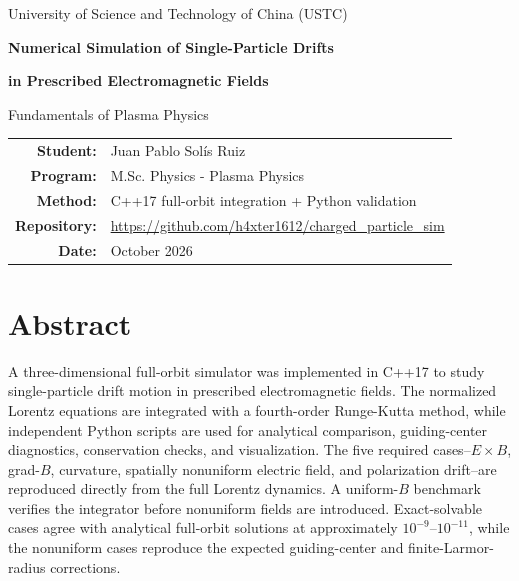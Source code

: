 \documentclass[11pt,a4paper]{article}
\begin{document}
\begin{titlepage}
    \centering
    \vspace*{2.0cm}

    {\Large University of Science and Technology of China (USTC)\par}
    \vspace{1.1cm}

    {\huge\bfseries Numerical Simulation of Single-Particle Drifts\par}
    \vspace{0.25cm}
    {\huge\bfseries in Prescribed Electromagnetic Fields\par}

    \vspace{1.4cm}
    {\Large Fundamentals of Plasma Physics\par}

    \vfill

    \begin{tabular}{rl}
        \textbf{Student:} & Juan Pablo Solís Ruiz \\
        \textbf{Program:} & M.Sc. Physics - Plasma Physics \\
        \textbf{Method:} & C++17 full-orbit integration + Python validation \\
	\textbf{Repository:} & \url{https://github.com/h4xter1612/charged_particle_sim} \\
        \textbf{Date:} & October 2026
    \end{tabular}

    \vfill


\end{titlepage}

\section*{Abstract}
A three-dimensional full-orbit simulator was implemented in C++17 to study single-particle drift motion in prescribed electromagnetic fields. The normalized Lorentz equations are integrated with a fourth-order Runge-Kutta method, while independent Python scripts are used for analytical comparison, guiding-center diagnostics, conservation checks, and visualization. The five required cases--$E\times B$, grad-$B$, curvature, spatially nonuniform electric field, and polarization drift--are reproduced directly from the full Lorentz dynamics. A uniform-$B$ benchmark verifies the integrator before nonuniform fields are introduced. Exact-solvable cases agree with analytical full-orbit solutions at approximately $10^{-9}$--$10^{-11}$, while the nonuniform cases reproduce the expected guiding-center and finite-Larmor-radius corrections.
\end{document}
